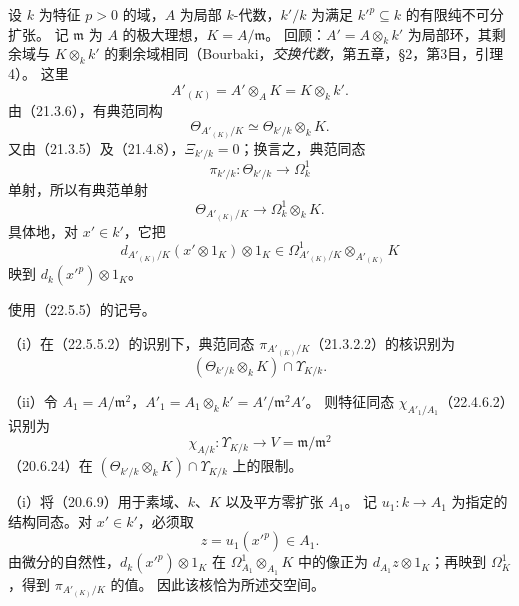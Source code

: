 设 $k$ 为特征 $p>0$ 的域，$A$ 为局部 $k$-代数，$k'/k$ 为满足 $k'^p\subseteq k$ 的有限纯不可分扩张。
记 $\mathfrak m$ 为 $A$ 的极大理想，$K=A/\mathfrak m$。
回顾：$A'=A\otimes_kk'$ 为局部环，其剩余域与 $K\otimes_kk'$ 的剩余域相同（Bourbaki，\textit{交换代数}，第五章，§2，第3目，引理4）。
这里
\[
 A'_{(K)}=A'\otimes_AK=K\otimes_kk'.
\]
由（21.3.6），有典范同构
\begin{equation}
 \Theta_{A'_{(K)}/K}\simeq\Theta_{k'/k}\otimes_kK.
 \tag{22.5.5.1}
\end{equation}
又由（21.3.5）及（21.4.8），$\Xi_{k'/k}=0$；换言之，典范同态
\[
 \pi_{k'/k}:\Theta_{k'/k}\longrightarrow\Omega^1_k
\]
单射，所以有典范单射
\begin{equation}
 \Theta_{A'_{(K)}/K}\longrightarrow\Omega^1_k\otimes_kK.
 \tag{22.5.5.2}
\end{equation}
具体地，对 $x'\in k'$，它把
\[
 d_{A'_{(K)}/K}(x'\otimes1_K)\otimes1_K
 \in\Omega^1_{A'_{(K)}/K}\otimes_{A'_{(K)}}K
\]
映到 $d_k(x'^p)\otimes1_K$。

使用（22.5.5）的记号。

\noindent（i）在（22.5.5.2）的识别下，典范同态
$\pi_{A'_{(K)}/K}$（21.3.2.2）的核识别为
\[
 (\Theta_{k'/k}\otimes_kK)\cap\Upsilon_{K/k}.
\]

\noindent（ii）令 $A_1=A/\mathfrak m^2$，$A'_1=A_1\otimes_kk'=A'/\mathfrak m^2A'$。
则特征同态 $\chi_{A'_1/A_1}$（22.4.6.2）识别为
\[
 \chi_{A/k}:\Upsilon_{K/k}\longrightarrow V=\mathfrak m/\mathfrak m^2
\]
（20.6.24）在 $(\Theta_{k'/k}\otimes_kK)\cap\Upsilon_{K/k}$ 上的限制。

\eproof
（i）将（20.6.9）用于素域、$k$、$K$ 以及平方零扩张 $A_1$。
记 $u_1:k\to A_1$ 为指定的结构同态。对 $x'\in k'$，必须取
\[
 z=u_1(x'^p)\in A_1.
\]
由微分的自然性，$d_k(x'^p)\otimes1_K$ 在
$\Omega^1_{A_1}\otimes_{A_1}K$ 中的像正为 $d_{A_1}z\otimes1_K$；再映到 $\Omega^1_K$，得到 $\pi_{A'_{(K)}/K}$ 的值。
因此该核恰为所述交空间。

